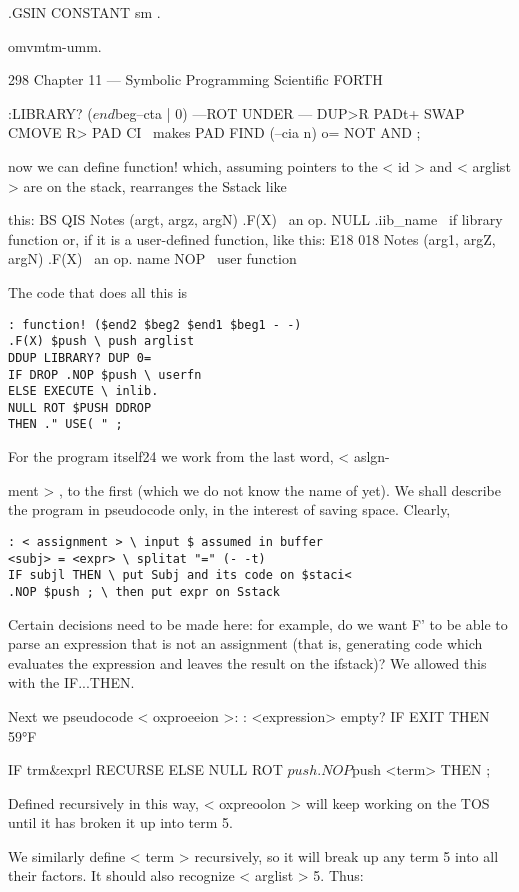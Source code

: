 .GSIN CONSTANT sm \etc.

omvmtm-umm.

298 Chapter 11 — Symbolic Programming Scientific FORTH

:LIBRARY? ($end$beg--cta | 0)
—ROT UNDER — DUP>R
PADt+ SWAP CMOVE R> PAD CI \ makes
PAD FIND (--cia n) o= NOT AND ;

now we can define function! which, assuming pointers to the
< id > and < arglist > are on the stack, rearranges the Sstack like

 

 

this:
BS QIS Notes
(argt, argz, argN) .F(X) \ an op.
NULL .iib\_name \ if library function
or, if it is a user-defined function, like this:
E18 018 Notes
(arg1, argZ, argN) .F(X) \ an op.
name NOP \ user function

The code that does all this is

\begin{lstlisting}
: function! ($end2 $beg2 $end1 $beg1 - -)
.F(X) $push \ push arglist
DDUP LIBRARY? DUP 0=
IF DROP .NOP $push \ userfn
ELSE EXECUTE \ inlib.
NULL ROT $PUSH DDROP
THEN ." USE( " ;
\end{lstlisting}

For the program itself24 we work from the last word, < aslgn-

ment > , to the first (which we do not know the name of yet).
We shall describe the program in pseudocode only, in the interest
of saving space. Clearly,

\begin{lstlisting}
: < assignment > \ input $ assumed in buffer
<subj> = <expr> \ splitat "=" (- -t)
IF subjl THEN \ put Subj and its code on $staci<
.NOP $push ; \ then put expr on Sstack
\end{lstlisting}

Certain decisions need to be made here: for example, do we want
F' to be able to parse an expression that is not an assignment (that
is, generating code which evaluates the expression and leaves the
result on the ifstack)? We allowed this with the IF...THEN.

Next we pseudocode < oxproeeion >:
: <expression> empty? IF EXIT THEN
59°F


IF trm\&exprl RECURSE
ELSE NULL ROT $push
.NOP $push <term>
THEN ;

Defined recursively in this way, < oxpreoolon > will keep
working on the TOS until it has broken it up into term 5.

We similarly define < term > recursively, so it will break up any
term 5 into all their factors. It should also recognize < arglist > 5.
Thus:

